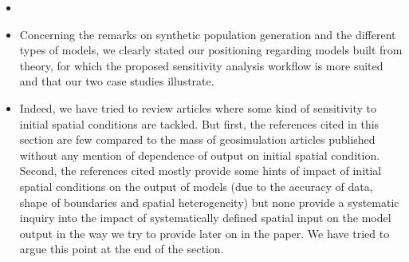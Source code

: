 \documentclass[11pt,a4paper,sans]{moderncv}        %
\begin{document}
\begin{itemize}
	\item {}
	
	\item Concerning the remarks on synthetic population generation and the different types of models, we clearly stated our positioning regarding models built from theory, for which the proposed sensitivity analysis workflow is more suited and that our two case studies illustrate.
	
	\item Indeed, we have tried to review articles where some kind of sensitivity to initial spatial conditions are tackled. But first, the references cited in this section are few compared to the mass of geosimulation articles published without any mention of dependence of output on initial spatial condition. Second, the references cited mostly provide some hints of impact of initial spatial conditions on the output of models (due to the accuracy of data, shape of boundaries and spatial heterogeneity) but none provide a systematic inquiry into the impact of systematically defined spatial input on the model output in the way we try to provide later on in the paper. We have tried to argue this point at the end of the section.
	

\end{itemize}
\end{document}
